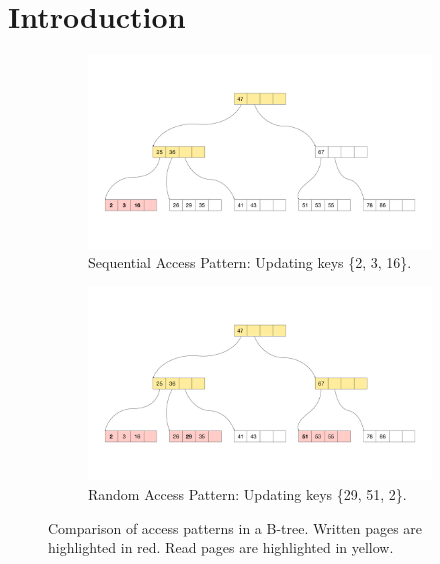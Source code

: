 
\chapter{Introduction}\label{chapter:introduction}

\begin{figure}[htpb]
  \centering
  \begin{subfigure}[t]{0.95\textwidth}
    \centering
    \includegraphics[width=\textwidth]{figures/sequential_access.pdf}
    \caption{Sequential Access Pattern: Updating keys \{2, 3, 16\}.}
    \label{fig:second-pdf}
  \end{subfigure}
  \hfill
  \begin{subfigure}[t]{0.95\textwidth}
    \centering
    \includegraphics[width=\textwidth]{figures/random_access.pdf}
    \caption{Random Access Pattern: Updating keys \{29, 51, 2\}.}
    \label{fig:first-pdf}
  \end{subfigure}
  \caption{Comparison of access patterns in a B-tree. Written pages are highlighted in red. Read pages are highlighted in yellow.}
  \label{fig:access-pattern-comparison}
\end{figure}

